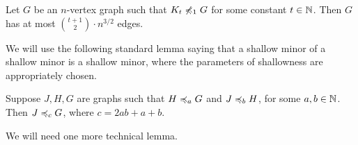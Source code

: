 \begin{corollary}\label{crl:densitynd}
Let $G$ be an $n$-vertex graph such that $K_t\not\preccurlyeq_1 G$ for
some constant $t\in \mathbb{N}$. Then $G$ has at most
$\binom{t+1}{2}\cdot n^{3/2}$ edges.
\end{corollary}

We will use the following standard lemma saying that a shallow minor of a shallow minor is a shallow minor, where the parameters of shallowness are appropriately chosen.

\begin{lemma}\label{lem:combineminors}
Suppose $J,H,G$ are graphs such that $H\preccurlyeq_a G$ and $J\preccurlyeq_b H$, for some $a,b\in \mathbb{N}$.
Then $J\preccurlyeq_c G$, where $c=2ab+a+b$.
\end{lemma}

We will need one more technical lemma.

